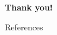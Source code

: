 \documentclass[10pt]{beamer}
\begin{document}
\begin{frame}{}
    \vfill
    \centering
    \Huge {
        \textbf{Thank you!}
    }
    \vfill
\end{frame}



\begin{frame}[allowframebreaks]{References}
    \small {

    
    
    
    }
\end{frame}
\end{document}
